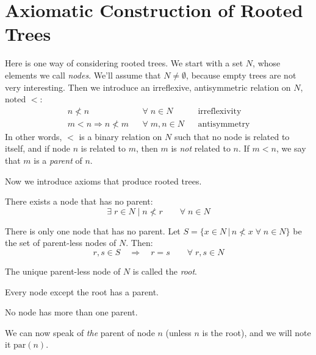 \chapter{Axiomatic Construction of Rooted Trees}

Here is one way of considering rooted trees. We start with a set $N$, whose
elements we call \emph{nodes}.  We'll assume that $N \neq \emptyset$, because
empty trees are not very interesting. Then we introduce an irreflexive,
antisymmetric relation on $N$, noted $<$:
\begin{align}
n \nless n & & \forall \; n \in N & & \text{irreflexivity} \\
m < n \Rightarrow n \nless m &  & \forall \; m, n \in N & &  \text{antisymmetry}
\end{align}
In other words, $<$ is a binary relation on $N$ such that no node is
related to itself, and if node $n$ is related to $m$, then $m$ is \emph{not}
related to $n$. If $m < n$, we say that $m$ is a \emph{parent} of $n$.

Now we introduce axioms that produce rooted trees.
\begin{axiom}
There exists a node that has no parent:
\[ \exists \; r \in N \; | \; n \nless r \qquad \forall \; n \in N \]
\end{axiom}

\begin{axiom}
There is only one node that has no parent. Let $S = \{x \in N\,|\, n \nless x \; \forall \; n \in N \}$ be the set of parent-less nodes of $N$. Then:
\[ r, s \in S \quad \Rightarrow \quad r = s \qquad \forall \;r, s \in N \]
\end{axiom} 

The unique parent-less node of $N$ is called the \emph{root}.

\begin{axiom}
Every node except the root has a parent.
\end{axiom} 

\begin{axiom}
No node has more than one parent.
\end{axiom} 

We can now speak of \emph{the} parent of node $n$ (unless $n$ is the root), and we will note it $\mathrm{par}(n)$.
